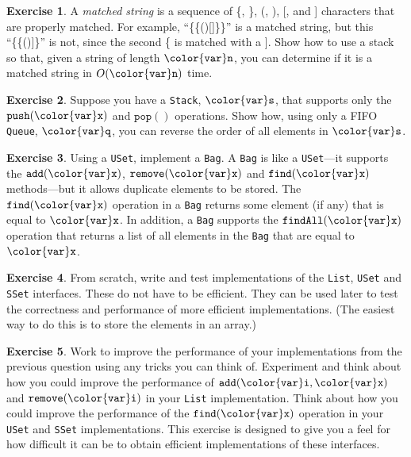 \documentclass[10pt]{book}
\theoremstyle{plain}
\theoremstyle{definition}
\newtheorem{exc}{Exercise}[chapter]
\begin{document}
\begin{exc}
  A \emph{matched string} is a sequence of \{, \}, (, ), [, and ]
  characters that are properly matched.  For example, ``\{\{()[]\}\}''
  is a matched string, but this ``\{\{()]\}'' is not, since the second \{
  is matched with a ].  Show how to use a stack so that, given a string
  of length \ensuremath{\mathtt{{\color{var}n}}}, you can determine if it is a matched string in $O(\ensuremath{\mathtt{{\color{var}n}}})$
  time.
\end{exc}

\begin{exc}
  Suppose you have a \texttt{Stack}, \ensuremath{\mathtt{{\color{var}s}}}, that supports only the \ensuremath{\mathtt{push({\color{var}x})}}
  and \ensuremath{\mathtt{pop()}} operations. Show how, using only a FIFO \texttt{Queue}, \ensuremath{\mathtt{{\color{var}q}}},
  you can reverse the order of all elements in \ensuremath{\mathtt{{\color{var}s}}}.
\end{exc}

\begin{exc}
  Using a \texttt{USet}, implement a \texttt{Bag}.  A \texttt{Bag} is like a \texttt{USet}---it
  supports the \ensuremath{\mathtt{add({\color{var}x})}}, \ensuremath{\mathtt{remove({\color{var}x})}} and \ensuremath{\mathtt{find({\color{var}x})}} methods---but it allows
  duplicate elements to be stored.  The \ensuremath{\mathtt{find({\color{var}x})}} operation in a \texttt{Bag}
  returns some element (if any) that is equal to \ensuremath{\mathtt{{\color{var}x}}}.  In addition,
  a \texttt{Bag} supports the \ensuremath{\mathtt{findAll({\color{var}x})}} operation that returns a list of
  all elements in the \texttt{Bag} that are equal to \ensuremath{\mathtt{{\color{var}x}}}.
\end{exc}

\begin{exc}
  From scratch, write and test implementations of the \texttt{List}, \texttt{USet}
  and \texttt{SSet} interfaces.  These do not have to be efficient.  They can
  be used later to test the correctness and performance of more efficient
  implementations.  (The easiest way to do this is to store the elements
  in an array.)
\end{exc}

\begin{exc}
  Work to improve the performance of your implementations from the
  previous question using any tricks you can think of.  Experiment and
  think about how you could improve the performance of \ensuremath{\mathtt{add({\color{var}i},{\color{var}x})}} and
  \ensuremath{\mathtt{remove({\color{var}i})}} in your \texttt{List} implementation.  Think about how you could
  improve the performance of the \ensuremath{\mathtt{find({\color{var}x})}} operation in your \texttt{USet}
  and \texttt{SSet} implementations.  This exercise is designed to give you a
  feel for  how difficult it can be to obtain efficient implementations
  of these interfaces.
\end{exc}
\end{document}
